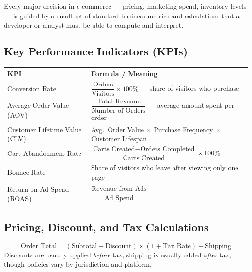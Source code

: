 \documentclass[11pt,a4paper]{article}
\begin{document}
\begin{definitionbox}
Every major decision in e-commerce --- pricing, marketing spend, inventory levels --- is guided by a small set of standard business metrics and calculations that a developer or analyst must be able to compute and interpret.
\end{definitionbox}

\subsection{Key Performance Indicators (KPIs)}
\begin{center}
\begin{tabular}{@{}p{3.4cm}p{9.8cm}@{}}
\toprule
\rowcolor{primary!15}
\textbf{KPI} & \textbf{Formula / Meaning} \\
\midrule
Conversion Rate & $\dfrac{\text{Orders}}{\text{Visitors}} \times 100\%$ --- share of visitors who purchase \\
\addlinespace
Average Order Value (AOV) & $\dfrac{\text{Total Revenue}}{\text{Number of Orders}}$ --- average amount spent per order \\
\addlinespace
Customer Lifetime Value (CLV) & Avg.\ Order Value $\times$ Purchase Frequency $\times$ Customer Lifespan \\
\addlinespace
Cart Abandonment Rate & $\dfrac{\text{Carts Created} - \text{Orders Completed}}{\text{Carts Created}} \times 100\%$ \\
\addlinespace
Bounce Rate & Share of visitors who leave after viewing only one page \\
\addlinespace
Return on Ad Spend (ROAS) & $\dfrac{\text{Revenue from Ads}}{\text{Ad Spend}}$ \\
\bottomrule
\end{tabular}
\end{center}

\subsection{Pricing, Discount, and Tax Calculations}
\begin{conceptbox}
$$
\text{Order Total} = (\text{Subtotal} - \text{Discount}) \times (1 + \text{Tax Rate}) + \text{Shipping}
$$
Discounts are usually applied \emph{before} tax; shipping is usually added \emph{after} tax, though policies vary by jurisdiction and platform.
\end{conceptbox}
\end{document}
